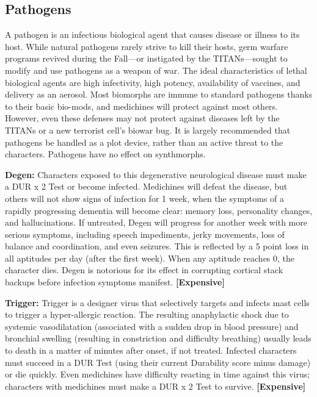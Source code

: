 \subsection{Pathogens}

A pathogen is an infectious biological agent that 
causes disease or illness to its host. While natural 
pathogens rarely strive to kill their hosts, germ warfare
programs revived during the Fall—or instigated
by the TITANs—sought to modify and use pathogens 
as a weapon of war. The ideal characteristics of lethal 
biological agents are high infectivity, high potency, 
availability of vaccines, and delivery as an aerosol. 
Most biomorphs are immune to standard pathogens 
thanks to their basic bio-mods, and medichines will 
protect against most others. However, even these 
defenses may not protect against diseases left by 
the TITANs or a new terrorist cell's biowar bug. It 
is largely recommended that pathogens be handled 
as a plot device, rather than an active threat to the 
characters. Pathogens have no effect on synthmorphs.

\textbf{Degen:} Characters exposed to this degenerative 
neurological disease must make a DUR x 2 Test or 
become infected. Medichines will defeat the disease, 
but others will not show signs of infection for 1 week, 
when the symptoms of a rapidly progressing dementia 
will become clear: memory loss, personality changes, 
and hallucinations. If untreated, Degen will progress 
for another week with more serious symptoms, including
speech impediments, jerky movements, loss
of balance and coordination, and even seizures. This 
is reflected by a 5 point loss in all aptitudes per day 
(after the first week). When any aptitude reaches 0, 
the character dies. Degen is notorious for its effect 
in corrupting cortical stack backups before infection 
symptoms manifest. \textbf{[Expensive]}

\textbf{Trigger:} Trigger is a designer virus that selectively 
targets and infects mast cells to trigger a hyper-allergic 
reaction. The resulting anaphylactic shock due to systemic
vasodilatation (associated with a sudden drop
in blood pressure) and bronchial swelling (resulting in 
constriction and difficulty breathing) usually leads to 
death in a matter of minutes after onset, if not treated. 
Infected characters must succeed in a DUR Test (using 
their current Durability score minus damage) or die 
quickly. Even medichines have difficulty reacting in 
time against this virus; characters with medichines 
must make a DUR x 2 Test to survive. \textbf{[Expensive]}

